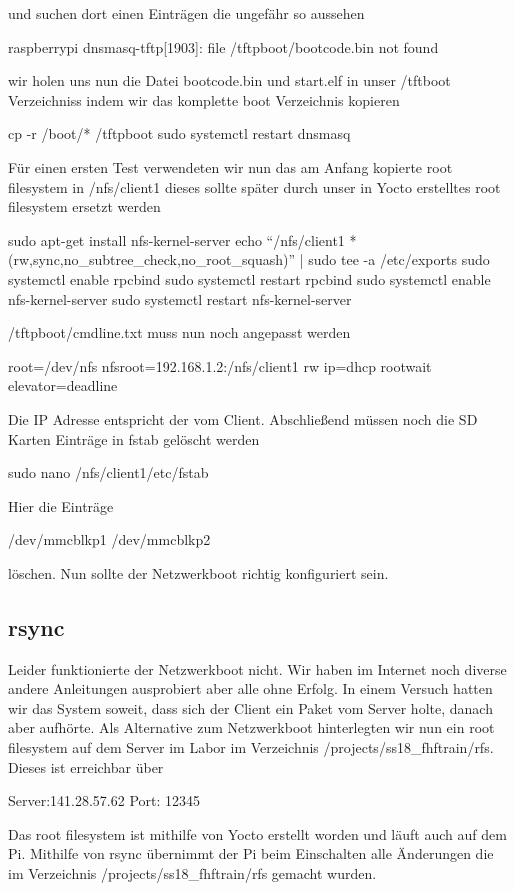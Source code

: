 \documentclass [a4paper,10pt] {article}
\begin{document}
			und suchen dort einen Einträgen die ungefähr so aussehen
			
			raspberrypi dnsmasq-tftp[1903]: file /tftpboot/bootcode.bin not found
			
			wir holen uns nun die Datei bootcode.bin und start.elf in unser /tftboot Verzeichniss indem wir das komplette boot Verzeichnis kopieren
			
			cp -r /boot/* /tftpboot
			sudo systemctl restart dnsmasq
			
			Für einen ersten Test verwendeten wir nun das am Anfang kopierte root filesystem in /nfs/client1 dieses sollte später durch unser in Yocto erstelltes root filesystem ersetzt werden
			
			sudo apt-get install nfs-kernel-server
			echo ``/nfs/client1 *(rw,sync,no\_subtree\_check,no\_root\_squash)'' | sudo tee -a /etc/exports
			sudo systemctl enable rpcbind
			sudo systemctl restart rpcbind
			sudo systemctl enable nfs-kernel-server
			sudo systemctl restart nfs-kernel-server
			
			/tftpboot/cmdline.txt muss nun noch angepasst werden
			
			root=/dev/nfs nfsroot=192.168.1.2:/nfs/client1 rw ip=dhcp rootwait elevator=deadline
			
			Die IP Adresse entspricht der vom Client. Abschließend müssen noch die SD Karten Einträge in fstab gelöscht werden
			
			sudo nano /nfs/client1/etc/fstab
			
			Hier die Einträge 
			
			/dev/mmcblkp1
			/dev/mmcblkp2
			
			löschen. Nun sollte der Netzwerkboot richtig konfiguriert sein.
			
		\vfill
		
		\subsection{rsync}
			Leider funktionierte der Netzwerkboot nicht. Wir haben im Internet noch diverse andere Anleitungen ausprobiert aber alle ohne Erfolg. In einem Versuch hatten wir das System soweit, dass sich der Client ein Paket vom Server holte, danach aber aufhörte. Als Alternative zum Netzwerkboot hinterlegten wir nun ein root filesystem auf dem Server im Labor im Verzeichnis /projects/ss18\_fhftrain/rfs. Dieses ist erreichbar über 
			
			Server:141.28.57.62 
			Port: 12345
			
			Das root filesystem ist mithilfe von Yocto erstellt worden und läuft auch auf dem Pi. Mithilfe von rsync übernimmt der Pi beim Einschalten alle Änderungen die im Verzeichnis /projects/ss18\_fhftrain/rfs gemacht wurden. 
			
\end{document}
